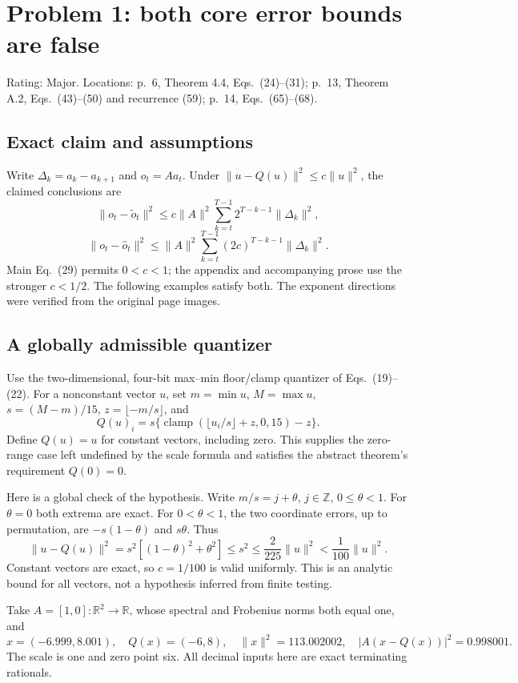 \documentclass[10pt]{article}
\begin{document}
\section*{Problem 1: both core error bounds are false}
Rating: Major. Locations: p. 6, Theorem 4.4, Eqs. (24)–(31); p. 13, Theorem A.2, Eqs. (43)–(50) and recurrence (59); p. 14, Eqs. (65)–(68).\par
\subsection*{Exact claim and assumptions}
Write \(\Delta_k=a_k-a_{k+1}\) and \(o_t=Aa_t\). Under \(\|u-Q(u)\|^2\le c\|u\|^2\), the claimed conclusions are \[\|o_t-\widetilde o_t\|^2
 \le c\|A\|^2\sum_{k=t}^{T-1}2^{T-k-1}\|\Delta_k\|^2, \tag{R1}\] \[\|o_t-\widehat o_t\|^2
 \le\|A\|^2\sum_{k=t}^{T-1}(2c)^{T-k-1}\|\Delta_k\|^2. \tag{R2}\] Main Eq. (29) permits \(0<c<1\); the appendix and accompanying prose use the stronger \(c<1/2\). The following examples satisfy both. The exponent directions were verified from the original page images.\par
\subsection*{A globally admissible quantizer}
Use the two-dimensional, four-bit max–min floor/clamp quantizer of Eqs. (19)–(22). For a nonconstant vector \(u\), set \(m=\min u\), \(M=\max u\), \(s=(M-m)/15\), \(z=\lfloor-m/s\rfloor\), and \[Q(u)_i=s\{\operatorname{clamp}(\lfloor u_i/s\rfloor+z,0,15)-z\}.\] Define \(Q(u)=u\) for constant vectors, including zero. This supplies the zero-range case left undefined by the scale formula and satisfies the abstract theorem’s requirement \(Q(0)=0\).\par
Here is a global check of the hypothesis. Write \(m/s=j+\theta\), \(j\in\mathbb Z\), \(0\le\theta<1\). For \(\theta=0\) both extrema are exact. For \(0<\theta<1\), the two coordinate errors, up to permutation, are \(-s(1-\theta)\) and \(s\theta\). Thus \[\|u-Q(u)\|^2
 =s^2[(1-\theta)^2+\theta^2]\le s^2
 \le\frac2{225}\|u\|^2<\frac1{100}\|u\|^2.\] Constant vectors are exact, so \(c=1/100\) is valid uniformly. This is an analytic bound for all vectors, not a hypothesis inferred from finite testing.\par
Take \(A=[1,0]:\mathbb R^2\to\mathbb R\), whose spectral and Frobenius norms both equal one, and \[x=(-6.999,8.001),\quad Q(x)=(-6,8),\quad
 \|x\|^2=113.002002,\quad
 |A(x-Q(x))|^2=0.998001.\] The scale is one and zero point six. All decimal inputs here are exact terminating rationals.\par
\end{document}
